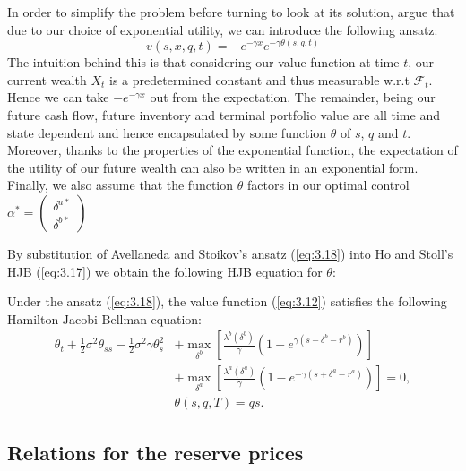 In order to simplify the problem before turning to look at its solution, 
\cite{AS2008} argue that due to our choice of exponential 
utility, we can introduce the following ansatz:
\begin{equation}\label{eq:3.18}
    v(s,x,q,t)=-e^{-\gamma x}e^{-\gamma\theta(s,q,t)}
\end{equation}
The intuition behind this is that considering our value function at 
time $t$, our current wealth $X_t$ is a predetermined constant and thus
measurable w.r.t $\mathcal{F}_t$. Hence we can take $-e^{-\gamma x}$
out from the expectation. The remainder, being our future cash flow, 
future inventory and terminal portfolio value are all time and state
dependent and hence encapsulated by some function $\theta$ of $s$, $q$
and $t$. Moreover, thanks to the properties of the exponential function, 
the expectation of the utility of our future wealth can also be 
written in an exponential form. Finally, we also assume that the function
$\theta$ factors in our optimal control $\alpha^*=\begin{pmatrix}\delta^{a*}\\\delta^{b*}\end{pmatrix}$

By substitution of Avellaneda and Stoikov's ansatz (\ref{eq:3.18}) into 
Ho and Stoll's HJB (\ref{eq:3.17}) we obtain the following HJB equation
for $\theta$:
\begin{theorem}\label{thm:3.7.2}
    Under the ansatz (\ref{eq:3.18}), the value function (\ref{eq:3.12}) satisfies 
    the following Hamilton-Jacobi-Bellman equation:
    \begin{equation}\label{eq:3.19}
            \begin{aligned}
                \theta_t+\frac{1}{2}\sigma^2\theta_{ss}-\frac{1}{2}\sigma^2\gamma\theta_{s}^2&+\max\limits_{\delta^b}\left[\frac{\lambda^b(\delta^b)}{\gamma}(1-e^{\gamma(s-\delta^b-r^b)})\right]\\
                &+\max\limits_{\delta^a}\left[\frac{\lambda^a(\delta^a)}{\gamma}(1-e^{-\gamma(s+\delta^a-r^a)})\right]=0,\\
                &\theta(s,q,T)=qs.
            \end{aligned}
    \end{equation}
\end{theorem}

\subsection*{Relations for the reserve prices}


